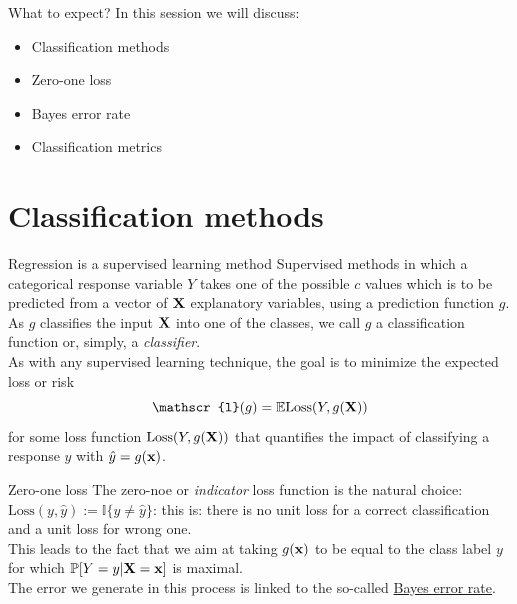 \documentclass{beamer}
\begin{document}
\begin{frame}{What to expect?}
  In this session we will discuss:
  \begin{itemize}
    \item Classification methods
    \item Zero-one loss
    \item Bayes error rate
    \item Classification metrics
  \end{itemize}
\end{frame}

\section{Classification methods}


\begin{frame}{Regression is a supervised learning method}
Supervised methods in which a categorical response variable $Y$ takes one of the possible $c$ values which is to be predicted from a vector of $\textbf{X}$ explanatory variables, using a prediction function $g$.\\[10pt]

As $g$ classifies the input $\textbf{X}$ into one of the classes, we call $g$ a classification function or, simply, a {\em classifier}.\\[10pt]

As with any supervised learning technique, the goal is to minimize the expected loss or risk
\begin{equation}
  \mathscr{l}(g)=\mathbb{E}\mathrm{Loss}(Y,g(\uvec{X}))
  \label{eq:risk}
\end{equation}
for some loss function $\mathrm{Loss}(Y,g(\textbf{X}))$ that quantifies the impact of classifying a response $y$ with $\hat{y}=g(\textbf{x})$.
\end{frame}

\begin{frame}{Zero-one loss}
    The zero-noe or {\em indicator} loss function is the natural choice: $\mathrm{Loss}(y,\hat{y}):=\mathbb{I}\{y\neq\hat{y}\}$: this is: there is no unit loss for a correct classification and a unit loss for wrong one.\\[10pt]
    This leads to the fact that we aim at taking  $g(\textbf{x})$ to be equal to the class label $y$ for which $\mathbb{P}[Y=y|\textbf{X}=\textbf{x}]$ is maximal.\\[10pt]
    The error we generate in this process is linked to the so-called \href{https://www.projectrhea.org/rhea/index.php/Upper_Bounds_for_Bayes_Error}{Bayes error rate}.
\end{frame}
\end{document}
